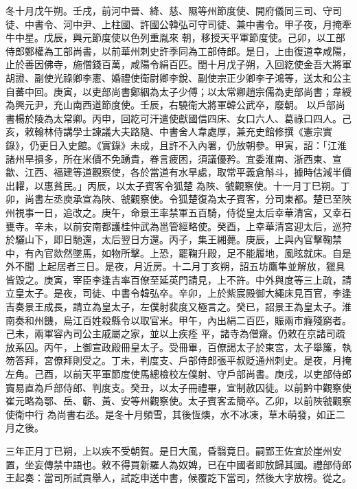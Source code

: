 \begin{pinyinscope}
 冬十月戊午朔。壬戌，前河中晉、絳、慈、隰等州節度使、開府儀同三司、守司徒、中書令、河中尹、上柱國、許國公韓弘可守司徒、兼中書令。甲子夜，月掩牽牛中星。戊辰，興元節度使以色列重胤來
 朝，移授天平軍節度使。己卯，以工部侍郎鄭權為工部尚書，以前華州刺史許季同為工部侍郎。是日，上由復道幸咸陽，止於善因佛寺，施僧錢百萬，咸陽令絹百匹。閏十月戊子朔，入回紇使金吾大將軍胡證、副使光祿卿李憲、婚禮使衛尉卿李銳、副使宗正少卿李子鴻等，送太和公主自蕃中回。庚寅，以吏部尚書鄭絪為太子少傅；以太常卿趙宗儒為吏部尚書；韋綬為興元尹，充山南西道節度使。壬辰，右驍衛大將軍韓公武卒，廢朝。
 以戶部尚書楊於陵為太常卿。丙申，回紇可汗遣使獻國信四床、女口六人、葛祿口四人。己亥，敕翰林侍講學士諫議大夫路隨、中書舍人韋處厚，兼充史館修撰《憲宗實錄》，仍更日入史館。《實錄》未成，且許不入內署，仍放朝參。甲寅，詔：「江淮諸州旱損多，所在米價不免踴貴，眷言疲困，須議優矜。宜委淮南、浙西東、宣歙、江西、福建等道觀察使，各於當道有水旱處，取常平義倉斛斗，據時估減半價出糶，以惠貧民。」丙辰，以太子賓客令狐楚
 為陜、虢觀察使。十一月丁巳朔。丁卯，尚書左丞庾承宣為陜、虢觀察使。令狐楚復為太子賓客，分司東都。楚已至陜州視事一日，追改之。庚午，命景王率禁軍五百騎，侍從皇太后幸華清宮，又幸石甕寺。辛未，以前安南都護桂仲武為邕管經略使。癸酉，上幸華清宮迎太后，巡狩於驪山下，即日馳還，太后翌日方還。丙子，集王緗薨。庚辰，上與內官擊鞠禁中，有內官欻然墜馬，如物所擊。上恐，罷鞠升殿，足不能履地，風眩就床。自是外不聞
 上起居者三日。是夜，月近房。十二月丁亥朔，詔五坊鷹隼並解放，獵具皆毀之。庚寅，宰臣李逢吉率百僚至延英門請見，上不許。中外與度等三上疏，請立皇太子。是夜，司徒、中書令韓弘卒。辛卯，上於紫宸殿御大繩床見百官，李逢吉奏景王成長，請立為皇太子，左僕射裴度又極言之。癸已，詔景王為皇太子。淮南奏和州饑，烏江百姓殺縣令以取官米。甲午，內出絹二百匹，賑兩市癃殘窮者。己未，兩軍容內司公主戚屬之家，並以上疾痊
 平，諸寺為僧齋。仍敕在京諸司疏放系囚。丙午，上御宣政殿冊皇太子。受冊畢，百僚謁太子於東宮，太子舉簾，執笏答拜，宮僚拜則受之。丁未，判度支、戶部侍郎張平叔貶通州刺史。是夜，月掩左角。己酉，以前天平軍節度使馬總檢校左僕射、守戶部尚書。庚戌，以吏部侍郎竇易直為戶部侍郎、判度支。癸丑，以太子冊禮畢，宣制赦囚徒。以前黔中觀察使崔元略為鄂、岳、蘄、黃、安等州觀察使。太子賓客孟簡卒。乙卯，以前陜虢觀察使衛中行
 為尚書右丞。是冬十月頻雪，其後恆燠，水不冰凍，草木萌發，如正二月之後。



 三年正月丁已朔，上以疾不受朝賀。是日大風，昏翳竟日。嗣郢王佐宜於崖州安置，坐妄傳禁中語也。敕不得買新羅人為奴婢，已在中國者即放歸其國。禮部侍郎王起奏：當司所試貢舉人，試訖申送中書，候覆訖下當司，然後大字放榜。從之。




\end{pinyinscope}
